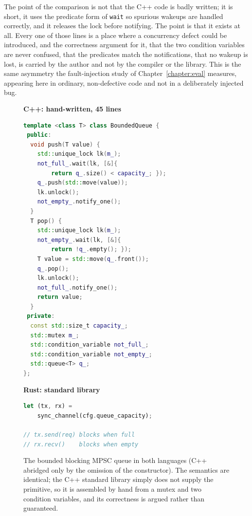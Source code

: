 \documentclass[english,twoside,openright,a4paper,censored,csm,software-track-2020]{HYthesisML}
\begin{document}
The point of the comparison is not that the C++ code is badly written; it is short, it uses
the predicate form of \texttt{wait} so spurious wakeups are handled correctly, and it releases
the lock before notifying. The point is that it exists at all. Every one of those lines is a
place where a concurrency defect could be introduced, and the correctness argument for it,
that the two condition variables are never confused, that the predicates match the
notifications, that no wakeup is lost, is carried by the author and not by the compiler or
the library. This is the same asymmetry the fault-injection study of Chapter~\ref{chapter:eval}
measures, appearing here in ordinary, non-defective code and not in a deliberately injected
bug.

\begin{figure}
\begin{minipage}[t]{0.52\linewidth}
\textbf{\footnotesize C++: hand-written, 45 lines}
\begin{lstlisting}[language=C++]
template <class T> class BoundedQueue {
 public:
  void push(T value) {
    std::unique_lock lk(m_);
    not_full_.wait(lk, [&]{
        return q_.size() < capacity_; });
    q_.push(std::move(value));
    lk.unlock();
    not_empty_.notify_one();
  }
  T pop() {
    std::unique_lock lk(m_);
    not_empty_.wait(lk, [&]{
        return !q_.empty(); });
    T value = std::move(q_.front());
    q_.pop();
    lk.unlock();
    not_full_.notify_one();
    return value;
  }
 private:
  const std::size_t capacity_;
  std::mutex m_;
  std::condition_variable not_full_;
  std::condition_variable not_empty_;
  std::queue<T> q_;
};
\end{lstlisting}
\end{minipage}\hfill
\begin{minipage}[t]{0.44\linewidth}
\textbf{\footnotesize Rust: standard library}
\begin{lstlisting}[language=Rust]
let (tx, rx) =
    sync_channel(cfg.queue_capacity);

// tx.send(req) blocks when full
// rx.recv()    blocks when empty
\end{lstlisting}
\end{minipage}
\caption[The bounded blocking MPSC queue in both languages]{The bounded blocking MPSC queue in both languages (C++ abridged only by the omission
of the constructor). The semantics are identical; the C++ standard library simply does not
supply the primitive, so it is assembled by hand from a mutex and two condition variables,
and its correctness is argued rather than
guaranteed.\label{lst:queue}}
\end{figure}
\end{document}

